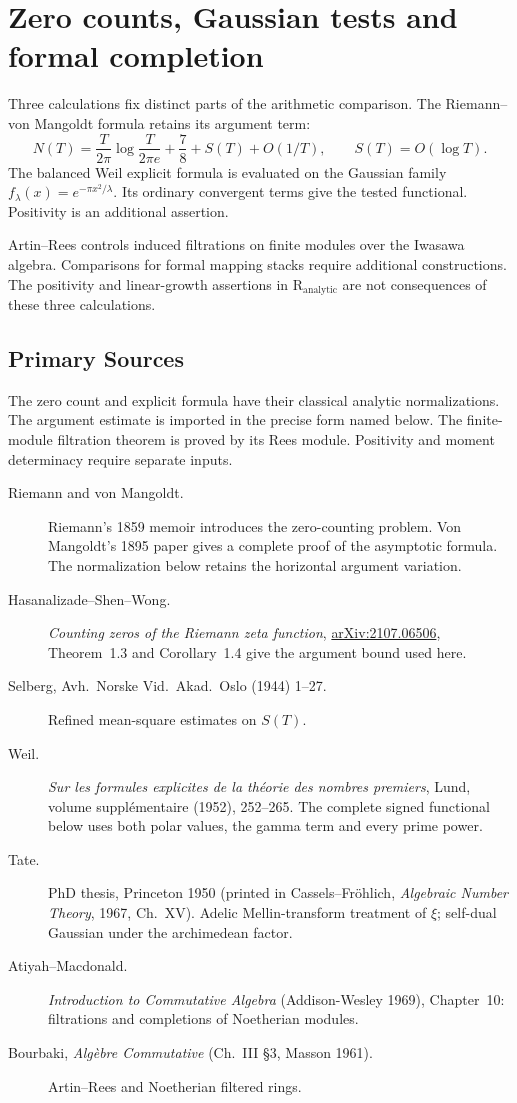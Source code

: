 \chapter{Zero counts, Gaussian tests and formal completion}
\label{v4-arith:w5-i:chapter}

Three calculations fix distinct parts of the arithmetic comparison.
The Riemann--von Mangoldt formula retains its argument term:
\[
N(T)=\frac{T}{2\pi}\log\frac{T}{2\pi e}+\frac78+S(T)+O(1/T),
\qquad S(T)=O(\log T).
\]
The balanced Weil explicit formula is evaluated on the Gaussian family
\(f_{\lambda}(x)=e^{-\pi x^{2}/\lambda}\). Its ordinary convergent
terms give the tested functional. Positivity is an additional assertion.

Artin--Rees controls induced filtrations on finite modules over the
Iwasawa algebra. Comparisons for formal mapping stacks require
additional constructions. The positivity and linear-growth assertions in
\(\mathrm{R}_{\mathrm{analytic}}\) are not consequences of these three
calculations.

\section{Primary Sources}
\label{v4-arith:w5-i:sources}

The zero count and explicit formula have their classical analytic
normalizations. The argument estimate is imported in the precise form
named below. The finite-module filtration theorem is proved by its
Rees module. Positivity and moment determinacy require separate inputs.

\begin{description}
\item[Riemann and von Mangoldt.] Riemann's 1859 memoir introduces the
zero-counting problem. Von Mangoldt's 1895 paper gives a complete proof
of the asymptotic formula. The normalization below retains the
horizontal argument variation.
\item[Hasanalizade--Shen--Wong.]
\emph{Counting zeros of the Riemann zeta function},
\href{https://arxiv.org/abs/2107.06506}{arXiv:2107.06506},
Theorem~1.3 and Corollary~1.4 give the argument bound used here.
\item[Selberg, Avh.~Norske Vid.~Akad.~Oslo (1944) 1--27.] Refined
mean-square estimates on \(S(T)\).
\item[Weil.] \emph{Sur les formules explicites de la th\'eorie des
nombres premiers}, Lund, volume suppl\'ementaire
(1952), 252--265. The complete signed functional below uses both polar
values, the gamma term and every prime power.
\item[Tate.] PhD thesis, Princeton 1950 (printed in Cassels--Fr\"ohlich,
\emph{Algebraic Number Theory}, 1967, Ch.~XV). Adelic
Mellin-transform treatment of \(\xi\); self-dual Gaussian under the
archimedean factor.
\item[Atiyah--Macdonald.] \emph{Introduction to Commutative Algebra}
(Addison-Wesley 1969), Chapter~10: filtrations and completions of
Noetherian modules.
\item[Bourbaki, \emph{Alg\`ebre Commutative} (Ch.~III \S3, Masson
1961).] Artin--Rees and Noetherian filtered
rings.
\end{description}

